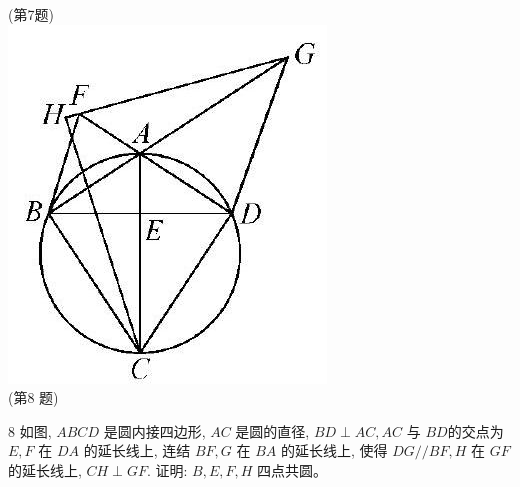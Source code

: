 \documentclass[10pt]{article}
\begin{document}
(第7题)\\
\includegraphics[max width=\textwidth, center]{2024_10_30_66b8e5e701da2093c133g-050(2)}\\
(第8 题)

8 如图, $A B C D$ 是圆内接四边形, $A C$ 是圆的直径, $B D \perp A C, A C$ 与 $B D$的交点为 $E, F$ 在 $D A$ 的延长线上, 连结 $B F, G$ 在 $B A$ 的延长线上, 使得 $D G / / B F, H$ 在 $G F$ 的延长线上, $C H \perp G F$. 证明: $B, E, F, H$ 四点共圆。
\end{document}
